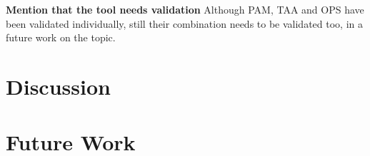 \textbf{Mention that the tool needs validation}
Although PAM, TAA and OPS have been validated individually, still their combination needs to be validated too, in a future work on the topic.

\chapter{Discussion}



\chapter{Future Work}





